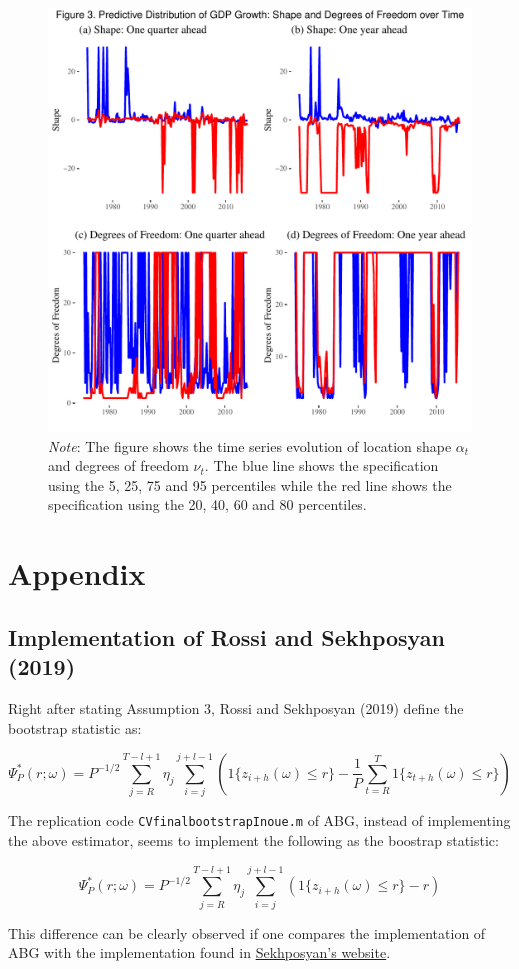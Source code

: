\documentclass[12pt,]{article}
\begin{document}
\begin{figure}
\centering
\includegraphics{figures/figure3.pdf}
\caption{\emph{Note}: The figure shows the time series evolution of
location shape \(\alpha_t\) and degrees of freedom \(\nu_t\). The blue
line shows the specification using the 5, 25, 75 and 95 percentiles
while the red line shows the specification using the 20, 40, 60 and 80
percentiles.}
\end{figure}

\newpage

\hypertarget{appendix}{%
\section{Appendix}\label{appendix}}

\hypertarget{implementation-of-rossi-and-sekhposyan-2019}{%
\subsection{Implementation of Rossi and Sekhposyan
(2019)}\label{implementation-of-rossi-and-sekhposyan-2019}}

Right after stating Assumption 3, Rossi and Sekhposyan (2019) define the
bootstrap statistic as:

\[
\Psi_P^*(r; \omega) = P^{-1/2}\sum_{j=R}^{T-l+1}\eta_j \sum_{i=j}^{j+l-1} \left ( 1\{z_{i+h}(\omega) \leq r \} - \frac{1}{P}\sum_{t=R}^{T}1\{z_{t+h}(\omega) \leq r \} \right )
\]

The replication code \texttt{CVfinalbootstrapInoue.m} of ABG, instead of
implementing the above estimator, seems to implement the following as
the boostrap statistic:

\[
\Psi_P^*(r; \omega) = P^{-1/2}\sum_{j=R}^{T-l+1}\eta_j \sum_{i=j}^{j+l-1} \left ( 1\{z_{i+h}(\omega) \leq r \} - r \right )
\]

This difference can be clearly observed if one compares the
implementation of ABG with the implementation found in
\href{http://www.tateviksekhposyan.org/example.zip}{Sekhposyan's
website}.
\end{document}
